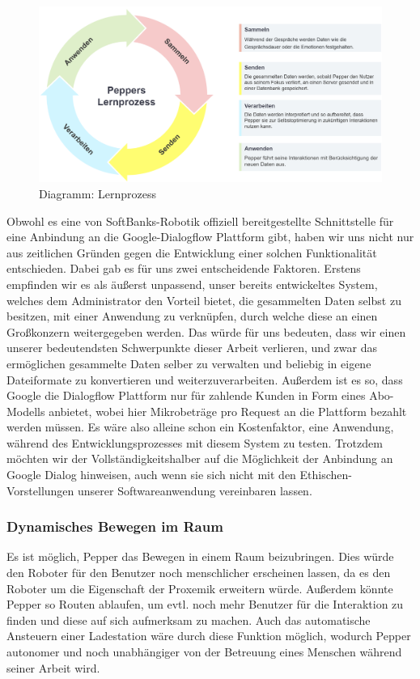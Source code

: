 \begin{figure}[H]
    \includegraphics[width=\textwidth]{Figures/pepper-lerprozess.png}
    \caption{Diagramm: Lernprozess}
    \label{fig:integration}
    \centering
\end{figure}

Obwohl es eine von SoftBanks-Robotik offiziell bereitgestellte Schnittstelle für eine Anbindung an die Google-Dialogflow Plattform gibt, haben wir uns nicht nur aus zeitlichen Gründen gegen die Entwicklung einer solchen Funktionalität entschieden. Dabei gab es für uns zwei entscheidende Faktoren. Erstens empfinden wir es als äußerst unpassend, unser bereits entwickeltes System, welches dem Administrator den Vorteil bietet, die gesammelten Daten selbst zu besitzen, mit einer Anwendung zu verknüpfen, durch welche diese an einen Großkonzern weitergegeben werden. Das würde für uns bedeuten, dass wir einen unserer bedeutendsten Schwerpunkte dieser Arbeit verlieren, und zwar das ermöglichen gesammelte Daten selber zu verwalten und beliebig in eigene Dateiformate zu konvertieren und weiterzuverarbeiten. Außerdem ist es so, dass Google die Dialogflow Plattform nur für zahlende Kunden in Form eines Abo-Modells anbietet, wobei hier Mikrobeträge pro Request an die Plattform bezahlt werden müssen. Es wäre also alleine schon ein Kostenfaktor, eine Anwendung, während des Entwicklungsprozesses mit diesem System zu testen. Trotzdem möchten wir der Vollständigkeitshalber auf die Möglichkeit der Anbindung an Google Dialog hinweisen, auch wenn sie sich nicht mit den Ethischen-Vorstellungen unserer Softwareanwendung vereinbaren lassen.

\subsubsection{Dynamisches Bewegen im Raum}

Es ist möglich, Pepper das Bewegen in einem Raum beizubringen. Dies würde den Roboter für den Benutzer noch menschlicher erscheinen lassen, da es den Roboter um die Eigenschaft der Proxemik erweitern würde. Außerdem könnte Pepper so Routen ablaufen, um evtl. noch mehr Benutzer für die Interaktion zu finden und diese auf sich aufmerksam zu machen. Auch das automatische Ansteuern einer Ladestation wäre durch diese Funktion möglich, wodurch Pepper autonomer und noch unabhängiger von der Betreuung eines Menschen während seiner Arbeit wird.

